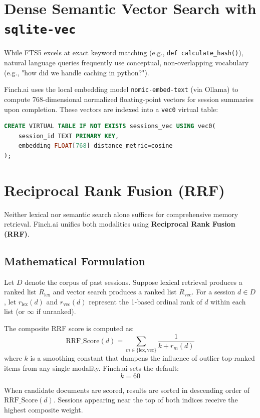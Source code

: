 \section{Dense Semantic Vector Search with \texttt{sqlite-vec}}
While FTS5 excels at exact keyword matching (e.g., \texttt{def calculate\_hash()}), natural language queries frequently use conceptual, non-overlapping vocabulary (e.g., "how did we handle caching in python?").

Finch.ai uses the local embedding model \texttt{nomic-embed-text} (via Ollama) to compute 768-dimensional normalized floating-point vectors for session summaries upon completion. These vectors are indexed into a \texttt{vec0} virtual table:

\begin{lstlisting}[language=SQL]
CREATE VIRTUAL TABLE IF NOT EXISTS sessions_vec USING vec0(
    session_id TEXT PRIMARY KEY,
    embedding FLOAT[768] distance_metric=cosine
);
\end{lstlisting}

\section{Reciprocal Rank Fusion (RRF)}
Neither lexical nor semantic search alone suffices for comprehensive memory retrieval. Finch.ai unifies both modalities using \textbf{Reciprocal Rank Fusion (RRF)}.

\subsection{Mathematical Formulation}
Let $D$ denote the corpus of past sessions. Suppose lexical retrieval produces a ranked list $R_{\text{lex}}$ and vector search produces a ranked list $R_{\text{vec}}$. For a session $d \in D$, let $r_{\text{lex}}(d)$ and $r_{\text{vec}}(d)$ represent the 1-based ordinal rank of $d$ within each list (or $\infty$ if unranked).

The composite RRF score is computed as:
\begin{equation}
    \text{RRF\_Score}(d) = \sum_{m \in \{\text{lex}, \text{vec}\}} \frac{1}{k + r_m(d)}
\end{equation}
where $k$ is a smoothing constant that dampens the influence of outlier top-ranked items from any single modality. Finch.ai sets the default:
\begin{equation}
    k = 60
\end{equation}

When candidate documents are scored, results are sorted in descending order of $\text{RRF\_Score}(d)$. Sessions appearing near the top of both indices receive the highest composite weight.

